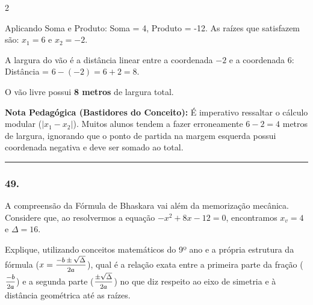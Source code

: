 \begin{multicols*}{2}
\begin{tcolorbox}[colback=CorTitUm!5, colframe=CorTitUm, boxrule=1pt, arc=4pt, left=6pt, right=6pt, top=6pt, bottom=6pt]
    Aplicando Soma e Produto:
    Soma = 4, Produto = -12. 
    As raízes que satisfazem são: $x_1 = 6$ e $x_2 = -2$.
    
    A largura do vão é a distância linear entre a coordenada $-2$ e a coordenada $6$:
    Distância = $6 - (-2) = 6 + 2 = 8$.
    
    O vão livre possui \textbf{8 metros} de largura total.
    \end{tcolorbox}
    \vspace{0.15cm}
    
    \begin{boxexplicacao}
    \textbf{Nota Pedagógica (Bastidores do Conceito):} É imperativo ressaltar o cálculo modular ($|x_1 - x_2|$). Muitos alunos tendem a fazer erroneamente $6 - 2 = 4$ metros de largura, ignorando que o ponto de partida na margem esquerda possui coordenada negativa e deve ser somado ao total.
    \end{boxexplicacao}
\fi

\par\vspace{\espacoQuestao}

\noindent\textcolor{CorLinha}{\rule{\linewidth}{0.5pt}} 
\par\vspace{\espacoPreQuestao}
\subsubsection*{49.} 
\begin{enunciadoLiteral}
A compreensão da Fórmula de Bhaskara vai além da memorização mecânica. Considere que, ao resolvermos a equação $-x^2 + 8x - 12 = 0$, encontramos $x_v = 4$ e $\Delta = 16$. 

Explique, utilizando conceitos matemáticos do 9º ano e a própria estrutura da fórmula ($x = \mfrac{-b \pm \sqrt{\Delta}}{2a}$), qual é a relação exata entre a primeira parte da fração ($\mfrac{-b}{2a}$) e a segunda parte ($\mfrac{\pm \sqrt{\Delta}}{2a}$) no que diz respeito ao eixo de simetria e à distância geométrica até as raízes.
\end{enunciadoLiteral}


\end{multicols*}
